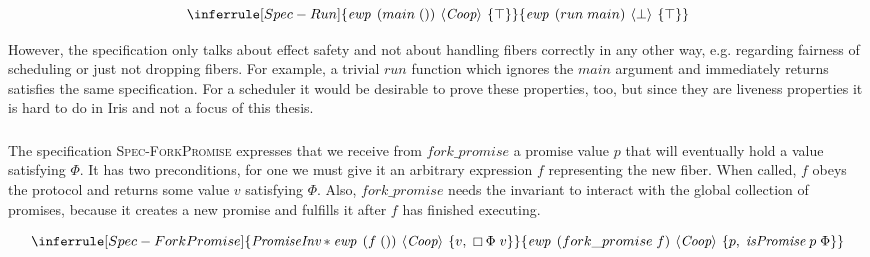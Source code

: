 \[
  \inferrule[Spec-Run]
  {\ewp{main\; ()}{\proto{}}{\top}}
  {\ewp{run\; main}{\bot}{\top}}
\]


However, the specification only talks about effect safety and not about handling fibers correctly in any other way, e.g. regarding fairness of scheduling or just not dropping fibers.
For example, a trivial \(run\) function which ignores the \(main\) argument and immediately returns satisfies the same specification.
For a scheduler it would be desirable to prove these properties, too, but since they are liveness properties it is hard to do in Iris and not a focus of this thesis.

\subsubsection{}
\label{sec:sched-spec-fork}

The specification \textsc{Spec-ForkPromise} expresses that we receive from \(fork\_promise\) a promise value \(p\) that will eventually hold a value satisfying \(\Phi\).
It has two preconditions, for one we must give it an arbitrary expression \(f\) representing the new fiber.
When called, \(f\) obeys the \proto{} protocol and returns some value \(v\) satisfying \(\Phi\).
Also, \(fork\_promise\) needs the \gsPInv{} invariant to interact with the global collection of promises, because it creates a new promise and fulfills it after \(f\) has finished executing.

\[
  \inferrule[Spec-ForkPromise]
  {\gsPInv{} \ast \ewp{f\;()}{\proto{}}{v,\; \always \Phi\; v}}
  {\ewp{fork\_promise\; f}{\proto{}}{p,\; \gsIsPr{}\; p\; \Phi}}
\]

